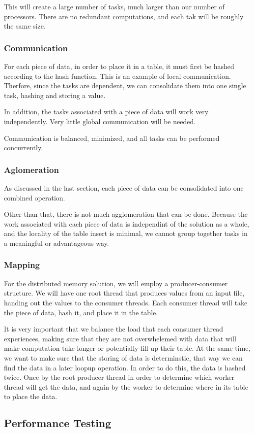 \documentclass{article}
\begin{document}
This will create a large number of tasks, much larger than our number of processors. There are no redundant computations, and each tak will be roughly the same size.

\subsubsection{Communication}
For each piece of data, in order to place it in a table, it must first be hashed according to the hash function. This is an example of local communication. Therfore, since the tasks are dependent, we can consolidate them into one single task, hashing and storing a value.

In addition, the tasks associated with a piece of data will work very independently. Very little global communication will be needed.

Communication is balanced, minimized, and all tasks can be performed concurrently.

\subsubsection{Aglomeration}
As discussed in the last section, each piece of data can be consolidated into one combined operation.

Other than that, there is not much agglomeration that can be done. Because the work associated with each piece of data is independint of the solution as a whole, and the locality of the table insert is minimal, we cannot group together tasks in a meaningful or advantageous way.

\subsubsection{Mapping}
For the distributed memory solution, we will employ a producer-consumer structure. We will have one root thread that produces values from an input file, handing out the values to the consumer threads. Each consumer thread will take the piece of data, hash it, and place it in the table.

It is very important that we balance the load that each consumer thread experiences, making sure that they are not overwhelemed with data that will make computation take longer or potentially fill up their table. At the same time, we want to make sure that the storing of data is determinstic, that way we can find the data in a later loopup operation. In order to do this, the data is hashed twice. Once by the root producer thread in order to determine which worker thread will get the data, and again by the worker to determine where in its table to place the data.



\subsection{Performance Testing}
\end{document}
